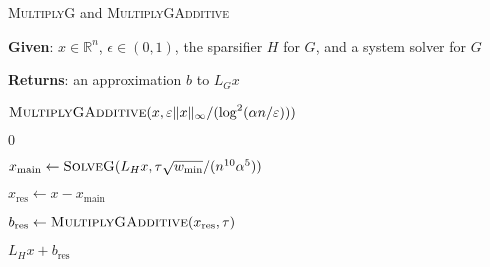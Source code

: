\begin{algorithm}\caption{\textsc{MultiplyG} and \textsc{MultiplyGAdditive}}\label{alg:multiplyG}
\begin{algorithmic}[1]
 

    \State \textbf{Given}: $x\in \mathbb{R}^n$, $\epsilon\in (0,1)$, the sparsifier $H$ for $G$, and a system solver for $G$
    
    \State \textbf{Returns}: an approximation $b$ to $L_G x$
    
    \State \Return $\textsc{MultiplyGAdditive}(x,\epsilon \|x\|_{\infty}/( \log^2(\alpha n/\epsilon)) )$

\EndProcedure
{}

    
        \State \Return $0$
    
    \EndIf
    
    \State $x_{\text{main}}\gets \textsc{SolveG}(L_H x,\tau \sqrt{w_{\min}}/(n^{10}\alpha^5))$
    
    \State $x_{\text{res}}\gets x - x_{\text{main}}$
    
    \State $b_{\text{res}}\gets \textsc{MultiplyGAdditive}(x_{\text{res}},\tau)$
    
    \State \Return $L_H x + b_{\text{res}}$ 

\EndProcedure
\end{algorithmic}
\end{algorithm}

